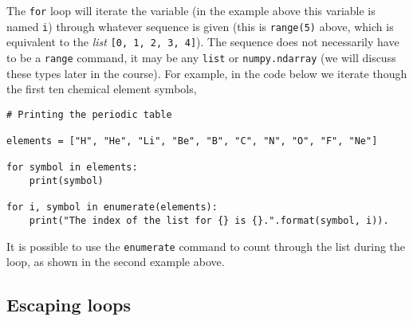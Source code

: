 \documentclass[a4paper]{article}
\begin{document}
The \texttt{for} loop will iterate the variable (in the example above this variable is named \texttt{i}) through whatever sequence is given (this is \texttt{range(5)} above, which is equivalent to the \emph{list} \texttt{[0, 1, 2, 3, 4]}).
The sequence does not necessarily have to be a \texttt{range} command, it may be any \texttt{list} or \texttt{numpy.ndarray} (we will discuss these types later in the course).
For example, in the code below we iterate though the first ten chemical element symbols,
\begin{lstlisting}
# Printing the periodic table

elements = ["H", "He", "Li", "Be", "B", "C", "N", "O", "F", "Ne"]

for symbol in elements:
	print(symbol)

for i, symbol in enumerate(elements):
	print("The index of the list for {} is {}.".format(symbol, i)).
\end{lstlisting}
It is possible to use the \texttt{enumerate} command to count through the list during the loop, as shown in the second example above.
\vspace{\baselineskip}
\begin{center}
	\noindent{}
\end{center}

\subsection{Escaping loops}
\end{document}
